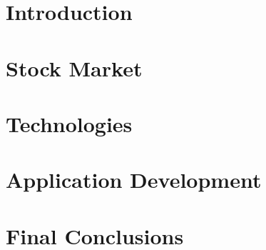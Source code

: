 \documentclass[a4paper, 12pt]{report}
\begin{document}





\tableofcontents

\listoftables
\listoffigures
\listofalgorithms


\chapter{Introduction}


\chapter{Stock Market}


\chapter{Technologies}


\chapter{Application Development}


\chapter{Final Conclusions}




\printbibliography[heading=bibintoc, title={Bibliography}]
\end{document}
